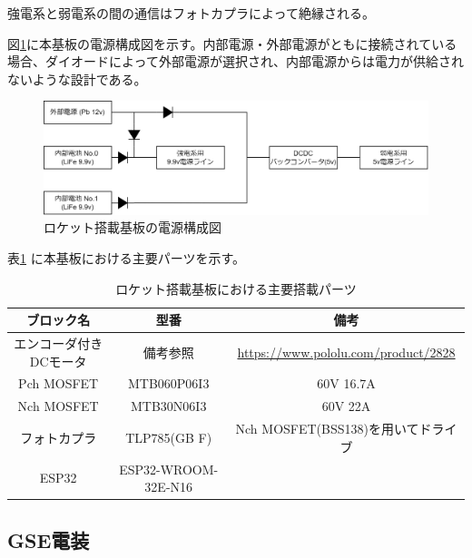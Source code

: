 \documentclass[dvipdfmx,a4j]{jsarticle}
\begin{document}
強電系と弱電系の間の通信はフォトカプラによって絶縁される。

図\ref{powerSupplyChart}に本基板の電源構成図を示す。内部電源・外部電源がともに接続されている場合、ダイオードによって外部電源が選択され、内部電源からは電力が供給されないような設計である。

\begin{figure}[htbp]
    \centering
    \includegraphics[width = 15cm]{figures/powerSupplyChart.drawio.png}
    \caption{ロケット搭載基板の電源構成図}
    \label{powerSupplyChart}
\end{figure}

表\ref{newGenPropulsionBRDPartList} に本基板における主要パーツを示す。

\begin{table}[htbp]
    \begin{tabular}{c|c|c}
        \hline
        ブロック名             & 型番                & 備考                                      \\ \hline \hline
        エンコーダ付きDCモータ & 備考参照            & \url{https://www.pololu.com/product/2828} \\ \hline
        Pch MOSFET             & MTB060P06I3         & 60V 16.7A                                 \\ \hline
        Nch MOSFET             & MTB30N06I3          & 60V 22A                                   \\ \hline
        フォトカプラ           & TLP785(GB F)        & Nch MOSFET(BSS138)を用いてドライブ        \\ \hline
        ESP32                  & ESP32-WROOM-32E-N16 &                                           \\
        \hline
    \end{tabular}
    \caption{ロケット搭載基板における主要搭載パーツ}
    \label{newGenPropulsionBRDPartList}
\end{table}


\subsection{GSE電装}
\end{document}
